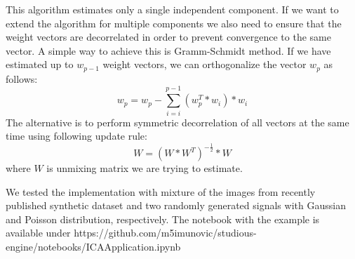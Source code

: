 \documentclass{article}
\begin{document}
This algorithm estimates only a single independent component. If we want to extend the algorithm for multiple components we also need to ensure that the weight vectors are decorrelated in order to prevent
convergence to the same vector. A simple way to achieve this is Gramm-Schmidt method. If we have estimated
up to $w_{p-1}$ weight vectors, we can orthogonalize the vector $w_p$ as follows:
\begin{equation}
    w_p = w_p - \sum_{i=i}^{p-1}(w_{p}^T*w_i)*w_i
\end{equation}
The alternative is to perform symmetric decorrelation of all vectors at the same time using following update rule:
\begin{equation}
    W = (W*W^T)^{-\frac{1}{2
    }}*W
\end{equation}
where $W$ is unmixing matrix we are trying to estimate.

We tested the implementation with mixture of the images from recently published synthetic dataset \cite{bae2023digiface1m} and two randomly generated signals with Gaussian and Poisson distribution, respectively. The notebook with the example is available under https://github.com/m5imunovic/studious-engine/notebooks/ICAApplication.ipynb


\end{document}
